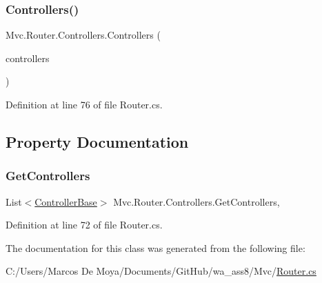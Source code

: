 \subsubsection{\texorpdfstring{Controllers()}{Controllers()}}
{\footnotesize\ttfamily Mvc.\+Router.\+Controllers.\+Controllers (\begin{DoxyParamCaption}\item[{List$<$ \hyperlink{class_mvc_1_1_controller_base}{Controller\+Base} $>$}]{controllers }\end{DoxyParamCaption})}



Definition at line 76 of file Router.\+cs.



\subsection{Property Documentation}
\mbox{\label{class_mvc_1_1_router_1_1_controllers_a8f55fab02be672919959fcae09b4494d}} 
\subsubsection{\texorpdfstring{Get\+Controllers}{GetControllers}}
{\footnotesize\ttfamily List$<$\hyperlink{class_mvc_1_1_controller_base}{Controller\+Base}$>$ Mvc.\+Router.\+Controllers.\+Get\+Controllers\hspace{0.3cm}{\ttfamily [get]}, {\ttfamily [set]}}



Definition at line 72 of file Router.\+cs.



The documentation for this class was generated from the following file\+:\begin{DoxyCompactItemize}
\item 
C\+:/\+Users/\+Marcos De Moya/\+Documents/\+Git\+Hub/wa\+\_\+ass8/\+Mvc/\hyperlink{_router_8cs}{Router.\+cs}\end{DoxyCompactItemize}
